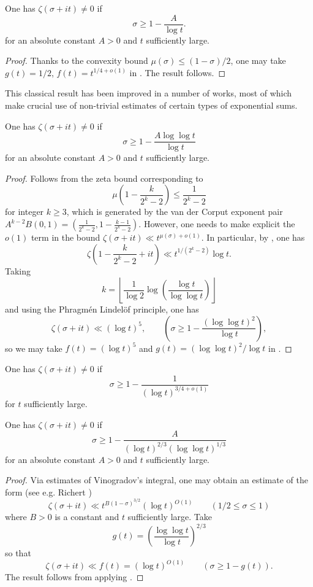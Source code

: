 \begin{theorem}\label{zfr-classical}
One has $\zeta(\sigma + it) \ne 0$ if 
\[
\sigma \ge 1 - \frac{A}{\log t}.
\]
for an absolute constant $A > 0$ and $t$ sufficiently large.
\end{theorem}
\begin{proof}
Thanks to the convexity bound $\mu(\sigma) \le (1-\sigma)/2$, one may take $g(t) = 1/2$, $f(t) = t^{1/4 + o(1)}$ in . The result follows.
\end{proof}

This classical result has been improved in a number of works, most of which make crucial use of non-trivial estimates of certain types of exponential sums.

\begin{theorem}\label{zfr-littlewood}
One has $\zeta(\sigma + it) \ne 0$ if 
\[
\sigma \ge 1 - \frac{A \log\log t}{\log t}
\]
for an absolute constant $A > 0$ and $t$ sufficiently large.
\end{theorem}
\begin{proof}
Follows from the zeta bound corresponding to
\[
\mu\left(1 - \frac{k}{2^k - 2}\right) \le \frac{1}{2^k - 2}
\]
for integer $k\ge 3$, which is generated by the van der Corput exponent pair $A^{k - 2}B(0, 1) = (\frac{1}{2^k - 2}, 1 - \frac{k - 1}{2^k - 2})$. However, one needs to make explicit the $o(1)$ term in the bound $\zeta(\sigma + it) \ll t^{\mu(\sigma) + o(1)}$. In particular, by \cite[Theorem 5.14]{titchmarsh_theory_1986}, one has 
\[
\zeta(1 - \frac{k}{2^k - 2} + it) \ll t^{1/(2^k - 2)}\log t.
\]
Taking 
\[
k = \left\lfloor \frac{1}{\log 2}\log\left(\frac{\log t}{\log\log t}\right)\right\rfloor
\]
and using the Phragm\'en Lindel\"of principle, one has 
\[
\zeta(\sigma + it) \ll (\log t)^5,\qquad (\sigma \ge 1 - \frac{(\log\log t)^2}{\log t}),
\]
so we may take $f(t) = (\log t)^5$ and $g(t) = (\log\log t)^2/\log t$ in .
\end{proof}

\begin{theorem}\label{zfr-chudakov}
One has $\zeta(\sigma + it) \ne 0$ if 
\[
\sigma \ge 1 - \frac{1}{(\log t)^{3/4 + o(1)}}
\]
for $t$ sufficiently large.
\end{theorem}

\begin{theorem}\label{zfr-vk}
One has $\zeta(\sigma + it) \ne 0$ if 
\[
\sigma \ge 1 - \frac{A}{(\log t)^{2/3}(\log\log t)^{1/3}}
\]
for an absolute constant $A > 0$ and $t$ sufficiently large.
\end{theorem}
\begin{proof}
Via estimates of Vinogradov's integral, one may obtain an estimate of the form (see e.g. Richert \cite{richert_zur_1967})
\[
\zeta(\sigma + it) \ll t^{B(1 - \sigma)^{3/2}}(\log t)^{O(1)}\qquad (1/2 \le \sigma \le 1)
\]
where $B > 0$ is a constant and $t$ sufficiently large. Take 
\[
g(t) = \left(\frac{\log\log t}{\log t}\right)^{2/3}
\]
so that
\[
\zeta(\sigma + it) \ll f(t) = (\log t)^{O(1)}\qquad (\sigma \ge 1 - g(t)).
\]
The result follows from applying .
\end{proof}
